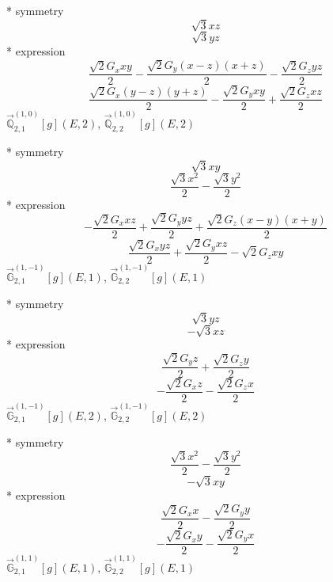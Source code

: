 \documentclass[fleqn,8pt]{jsarticle}
\begin{document}
\noindent\quad ** symmetry
\begin{dmath*}
\sqrt{3} x z
\end{dmath*}
\begin{dmath*}
\sqrt{3} y z
\end{dmath*}
\noindent\quad ** expression
\begin{dmath*}
\frac{\sqrt{2} G_{x} x y}{2} - \frac{\sqrt{2} G_{y} \left(x - z\right) \left(x + z\right)}{2} - \frac{\sqrt{2} G_{z} y z}{2}
\end{dmath*}
\begin{dmath*}
\frac{\sqrt{2} G_{x} \left(y - z\right) \left(y + z\right)}{2} - \frac{\sqrt{2} G_{y} x y}{2} + \frac{\sqrt{2} G_{z} x z}{2}
\end{dmath*}
\noindent\quad $\vec{\mathbb{Q}}_{2,1}^{(1,0)}[g](E,2)$, $\vec{\mathbb{Q}}_{2,2}^{(1,0)}[g](E,2)$

\noindent\quad ** symmetry
\begin{dmath*}
\sqrt{3} x y
\end{dmath*}
\begin{dmath*}
\frac{\sqrt{3} x^{2}}{2} - \frac{\sqrt{3} y^{2}}{2}
\end{dmath*}
\noindent\quad ** expression
\begin{dmath*}
- \frac{\sqrt{2} G_{x} x z}{2} + \frac{\sqrt{2} G_{y} y z}{2} + \frac{\sqrt{2} G_{z} \left(x - y\right) \left(x + y\right)}{2}
\end{dmath*}
\begin{dmath*}
\frac{\sqrt{2} G_{x} y z}{2} + \frac{\sqrt{2} G_{y} x z}{2} - \sqrt{2} G_{z} x y
\end{dmath*}
\noindent\quad $\vec{\mathbb{G}}_{2,1}^{(1,-1)}[g](E,1)$, $\vec{\mathbb{G}}_{2,2}^{(1,-1)}[g](E,1)$

\noindent\quad ** symmetry
\begin{dmath*}
\sqrt{3} y z
\end{dmath*}
\begin{dmath*}
- \sqrt{3} x z
\end{dmath*}
\noindent\quad ** expression
\begin{dmath*}
\frac{\sqrt{2} G_{y} z}{2} + \frac{\sqrt{2} G_{z} y}{2}
\end{dmath*}
\begin{dmath*}
- \frac{\sqrt{2} G_{x} z}{2} - \frac{\sqrt{2} G_{z} x}{2}
\end{dmath*}
\noindent\quad $\vec{\mathbb{G}}_{2,1}^{(1,-1)}[g](E,2)$, $\vec{\mathbb{G}}_{2,2}^{(1,-1)}[g](E,2)$

\noindent\quad ** symmetry
\begin{dmath*}
\frac{\sqrt{3} x^{2}}{2} - \frac{\sqrt{3} y^{2}}{2}
\end{dmath*}
\begin{dmath*}
- \sqrt{3} x y
\end{dmath*}
\noindent\quad ** expression
\begin{dmath*}
\frac{\sqrt{2} G_{x} x}{2} - \frac{\sqrt{2} G_{y} y}{2}
\end{dmath*}
\begin{dmath*}
- \frac{\sqrt{2} G_{x} y}{2} - \frac{\sqrt{2} G_{y} x}{2}
\end{dmath*}
\noindent\quad $\vec{\mathbb{G}}_{2,1}^{(1,1)}[g](E,1)$, $\vec{\mathbb{G}}_{2,2}^{(1,1)}[g](E,1)$
\end{document}
